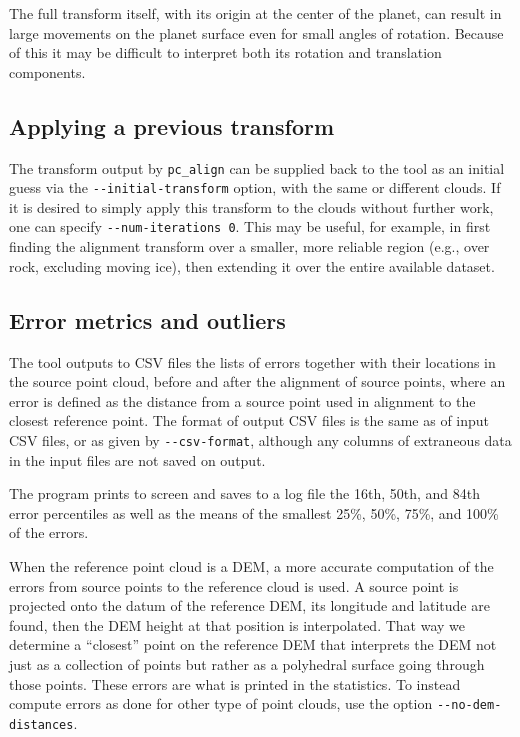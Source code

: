 The full transform itself, with its origin at the center of the planet,
can result in large movements on the planet surface even for small angles
of rotation. Because of this it may be difficult to interpret both its rotation
and translation components.

\subsection{Applying a previous transform}
\label{prevtrans}

The transform output by \texttt{pc\_align} can be supplied back to the
tool as an initial guess via the \texttt{-\/-initial-transform} option,
with the same or different clouds. If it is desired to simply apply this
transform to the clouds without further work, one can specify
\texttt{-\/-num-iterations 0}.  This may be useful, for example, in
first finding the alignment transform over a smaller, more reliable
region (e.g., over rock, excluding moving ice), then extending it over the entire
available dataset.

\subsection{Error metrics and outliers}

The tool outputs to CSV files the lists of errors together with their
locations in the source point cloud, before and after the alignment of
source points, where an error is defined as the distance from a source
point used in alignment to the closest reference point. The format of
output CSV files is the same as of input CSV files, or as given by
\texttt{-\/-csv-format}, although any columns of extraneous data in the
input files are not saved on output.

The program prints to screen and saves to a log file the 16th, 50th, and
84th error percentiles as well as the means of the smallest 25\%, 50\%,
75\%, and 100\% of the errors.

When the reference point cloud is a DEM, a more accurate computation of
the errors from source points to the reference cloud is used. A source
point is projected onto the datum of the reference DEM, its longitude
and latitude are found, then the DEM height at that position is
interpolated.  That way we determine a ``closest'' point on the
reference DEM that interprets the DEM not just as a collection of points
but rather as a polyhedral surface going through those points. These
errors are what is printed in the statistics. To instead compute
errors as done for other type of point clouds, use the option
\texttt{-\/-no-dem-distances}.


